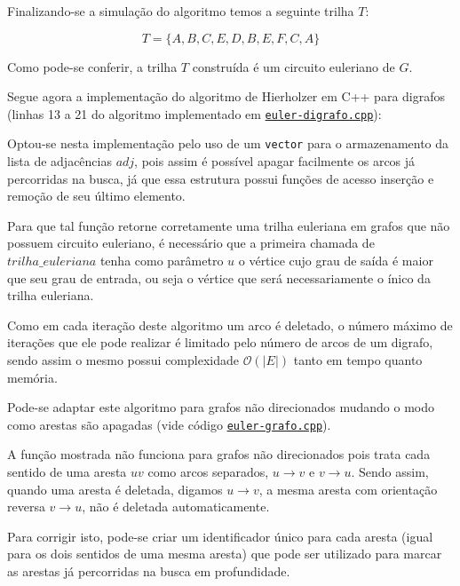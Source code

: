 Finalizando-se a simulação do algoritmo temos a seguinte trilha $T$:

\[
    T = \{A, B, C, E, D, B, E, F, C, A\}
\]

Como pode-se conferir, a trilha $T$ construída é um circuito euleriano de $G$.


Segue agora a implementação do algoritmo de Hierholzer em C++ para digrafos (linhas 13 a 21 do algoritmo implementado em \href{https://github.com/gafeol/chinese-postman/blob/master/code/euler-digrafo.cpp}{\texttt{euler-digrafo.cpp}}):



Optou-se nesta implementação pelo uso de um \texttt{vector} para o armazenamento da lista de adjacências $adj$, pois assim é possível apagar facilmente os arcos já percorridas na busca, já que essa estrutura possui funções de acesso inserção e remoção de seu último elemento.

Para que tal função retorne corretamente uma trilha euleriana em grafos que não possuem circuito euleriano, é necessário que a primeira chamada de $trilha\_euleriana$ tenha como parâmetro $u$ o vértice cujo grau de saída é maior que seu grau de entrada, ou seja o vértice que será necessariamente o ínico da trilha euleriana.

Como em cada iteração deste algoritmo um arco é deletado, o número máximo de iterações que ele pode realizar é limitado pelo número de arcos de um digrafo, sendo assim o mesmo possui complexidade $\mathcal{O}(|E|)$ tanto em tempo quanto memória.

Pode-se adaptar este algoritmo para grafos não direcionados mudando o modo como arestas são apagadas (vide código \href{https://github.com/gafeol/chinese-postman/blob/master/code/euler-grafo.cpp}{\texttt{euler-grafo.cpp}}).

A função mostrada não funciona para grafos não direcionados pois trata cada sentido de uma aresta $uv$ como arcos separados, $u \rightarrow v$ e $v \rightarrow u$. 
Sendo assim, quando uma aresta é deletada, digamos $u \rightarrow v$, a mesma aresta com orientação reversa $v \rightarrow u$, não é deletada automaticamente.

Para corrigir isto, pode-se criar um identificador único para cada aresta (igual para os dois sentidos de uma mesma aresta) que pode ser utilizado para marcar as arestas já percorridas na busca em profundidade.
